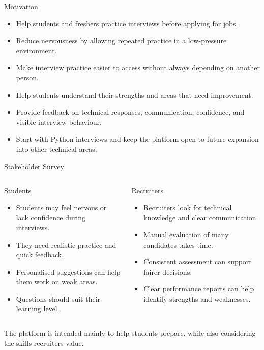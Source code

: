 \documentclass[aspectratio=169,11pt]{beamer}
\begin{document}
\begin{frame}{Motivation}
\begin{itemize}
  \item Help students and freshers practice interviews before applying for jobs.
  \item Reduce nervousness by allowing repeated practice in a low-pressure environment.
  \item Make interview practice easier to access without always depending on another person.
  \item Help students understand their strengths and areas that need improvement.
  \item Provide feedback on technical responses, communication, confidence, and visible interview behaviour.
  \item Start with Python interviews and keep the platform open to future expansion into other technical areas.
\end{itemize}
\end{frame}

\begin{frame}{Stakeholder Survey}
\begin{columns}[T,onlytextwidth]
\begin{block}{Students}
\begin{itemize}
  \item Students may feel nervous or lack confidence during interviews.
  \item They need realistic practice and quick feedback.
  \item Personalised suggestions can help them work on weak areas.
  \item Questions should suit their learning level.
\end{itemize}
\end{block}
\begin{block}{Recruiters}
\begin{itemize}
  \item Recruiters look for technical knowledge and clear communication.
  \item Manual evaluation of many candidates takes time.
  \item Consistent assessment can support fairer decisions.
  \item Clear performance reports can help identify strengths and weaknesses.
\end{itemize}
\end{block}
\end{columns}
\vspace{0.15cm}
\centering
\small The platform is intended mainly to help students prepare, while also considering the skills recruiters value.
\end{frame}
\end{document}
